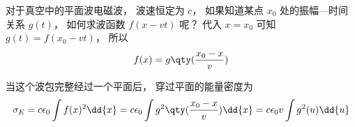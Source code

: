
对于真空中的平面波电磁波， 波速恒定为 $c$， 如果知道某点 $x_0$ 处的振幅—时间关系 $g(t)$， 如何求波函数 $f(x - vt)$ 呢？ 代入 $x = x_0$ 可知 $g(t) = f(x_0 - vt)$， 所以
\begin{equation}
f(x) = g\qty(\frac{x_0 - x}{v})
\end{equation}

当这个波包完整经过一个平面后， 穿过平面的能量密度为
\begin{equation}
\sigma_E = c\epsilon_0 \int f(x)^2 \dd{x} = c\epsilon_0  \int g^2\qty(\frac{x_0 - x}{v}) \dd{x} = c\epsilon_0 v \int g^2(u) \dd{u}
\end{equation}
